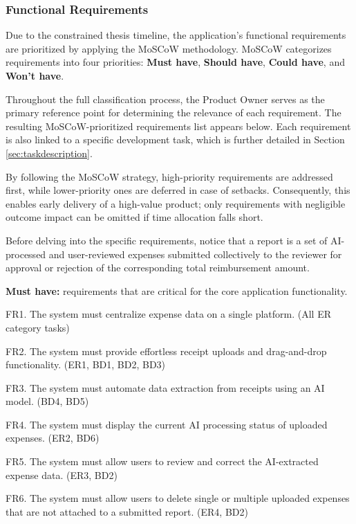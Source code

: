 \subsubsection{Functional Requirements}
\label{sec:functional-requirements}

Due to the constrained thesis timeline, the application's functional requirements are prioritized by applying the MoSCoW methodology. MoSCoW categorizes requirements into four priorities: \textbf{Must have}, \textbf{Should have}, \textbf{Could have}, and \textbf{Won't have}. 

Throughout the full classification process, the Product Owner serves as the primary reference point for determining the relevance of each requirement. The resulting MoSCoW-prioritized requirements list appears below. Each requirement is also linked to a specific development task, which is further detailed in Section \ref{sec:taskdescription}.

By following the MoSCoW strategy, high-priority requirements are addressed first, while lower-priority ones are deferred in case of setbacks. Consequently, this enables early delivery of a high-value product; only requirements with negligible outcome impact can be omitted if time allocation falls short.

Before delving into the specific requirements, notice that a report is a set of AI-processed and user-reviewed expenses submitted collectively to the reviewer for approval or rejection of the corresponding total reimbursement amount. 

\textbf{Must have:} requirements that are critical for the core application functionality.

FR1. The system must centralize expense data on a single platform. (All ER category tasks)

FR2. The system must provide effortless receipt uploads and drag-and-drop functionality. (ER1, BD1, BD2, BD3)

FR3. The system must automate data extraction from receipts using an AI model. (BD4, BD5)

FR4. The system must display the current AI processing status of uploaded expenses.  (ER2, BD6)

FR5. The system must allow users to review and correct the AI-extracted expense data. (ER3, BD2)

FR6. The system must allow users to delete single or multiple uploaded expenses that are not attached to a submitted report. (ER4, BD2)

